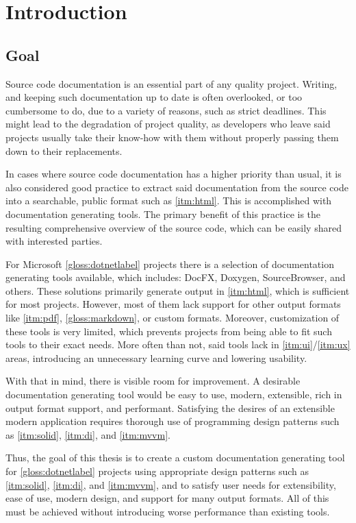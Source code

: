 \chapter*{Introduction}

\section*{Goal}

Source code documentation is an essential part of any quality project. Writing, and keeping such documentation up to date is often overlooked, or too cumbersome to do, due to a variety of reasons, such as strict deadlines. This might lead to the degradation of project quality, as developers who leave said projects usually take their know-how with them without properly passing them down to their replacements.

In cases where source code documentation has a higher priority than usual, it is also considered good practice to extract said documentation from the source code into a searchable, public format such as \ref{itm:html}. This is accomplished with documentation generating tools. The primary benefit of this practice is the resulting comprehensive overview of the source code, which can be easily shared with interested parties.

For Microsoft \ref{gloss:dotnetlabel} projects there is a selection of documentation generating tools available, which includes: DocFX, Doxygen, SourceBrowser, and others. These solutions primarily generate output in \ref{itm:html}, which is sufficient for most projects. However, most of them lack support for other output formats like \ref{itm:pdf}, \ref{gloss:markdown}, or custom formats. Moreover, customization of these tools is very limited, which prevents projects from being able to fit such tools to their exact needs. More often than not, said tools lack in \ref{itm:ui}/\ref{itm:ux} areas, introducing an unnecessary learning curve and lowering usability.

With that in mind, there is visible room for improvement. A desirable documentation generating tool would be easy to use, modern, extensible, rich in output format support, and performant. Satisfying the desires of an extensible modern application requires thorough use of programming design patterns such as \ref{itm:solid}, \ref{itm:di}, and \ref{itm:mvvm}.

Thus, the goal of this thesis is to create a custom documentation generating tool for \ref{gloss:dotnetlabel} projects using appropriate design patterns such as \ref{itm:solid}, \ref{itm:di}, and \ref{itm:mvvm}, and to satisfy user needs for extensibility, ease of use, modern design, and support for many output formats. All of this must be achieved without introducing worse performance than existing tools.

